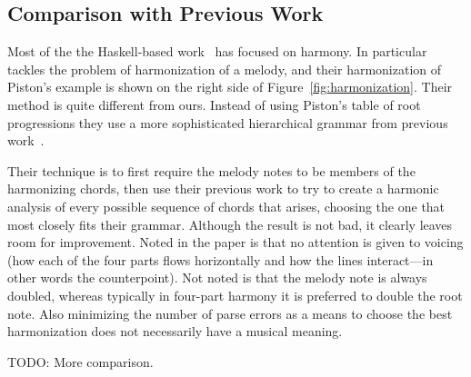 \HarmonizationMT

\subsection{Comparison with Previous Work}
\label{sec:harmony:compare}

Most of the the Haskell-based
work~\citep{magalhaes-harmtrace,koops-fharm,magalhaes-fcomp} has
focused on harmony. In particular \fharm~\citep{koops-fharm} tackles
the problem of harmonization of a melody, and their harmonization of
Piston's example is shown on the right side of
Figure~\ref{fig:harmonization}. Their method is quite different from
ours. Instead of using Piston's table of root progressions they use a
more sophisticated hierarchical grammar from previous
work~\citep{magalhaes-harmtrace}.

Their technique is to first require the melody notes to be members of
the harmonizing chords, then use their previous work to try to
create a harmonic analysis of every possible sequence of chords that
arises, choosing the one that most closely fits their
grammar. Although the result is not bad, it clearly leaves room for
improvement. Noted in the paper is that no attention is given to
voicing (how each of the four parts flows horizontally and how the
lines interact---in other words the counterpoint). Not noted is that
the melody note is always doubled, whereas typically in four-part
harmony it is preferred to double the root note. Also minimizing the
number of parse errors as a means to choose the best harmonization
does not necessarily have a musical meaning.

TODO: More comparison.
